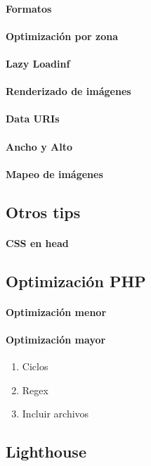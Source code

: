 \documentclass[12pt]{report}
\begin{document}
			\paragraph{Formatos}
			\paragraph{Optimización por zona}
			\paragraph{Lazy Loadinf}
			\paragraph{Renderizado de imágenes}
			\paragraph{Data URIs}
			\paragraph{Ancho y Alto}
			\paragraph{Mapeo de imágenes}
		\subsection{Otros tips}
			\paragraph{CSS en head}
		\subsection{Optimización PHP}
			\paragraph{Optimización menor}
			\paragraph{Optimización mayor}
				\begin{enumerate}
					\item Ciclos
					\item Regex
					\item Incluir archivos
				\end{enumerate}
		\subsection{Lighthouse}
\end{document}

